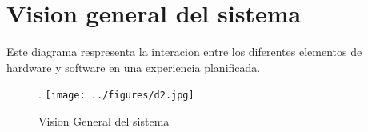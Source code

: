 \section{Vision general del sistema}

Este diagrama respresenta la interacion entre los diferentes elementos de hardware y software en una experiencia planificada.

\begin{figure}[!htb].
    \texttt{[image: ../figures/d2.jpg]}
    \caption{Vision General del sistema}
    \label{fig:d1}
\end{figure}